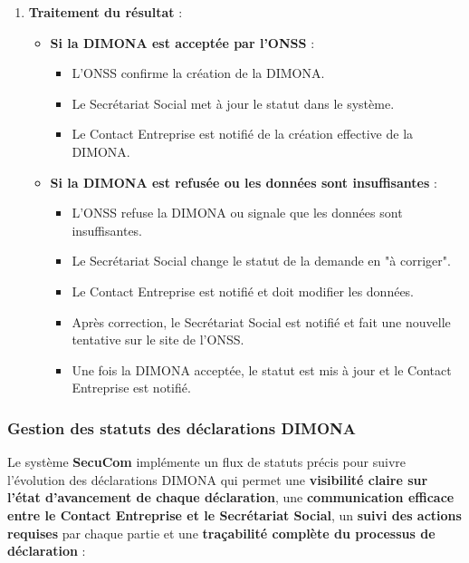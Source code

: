 \begin{enumerate}
  \newpage
  \item \textbf{Traitement du résultat} :
    \begin{itemize}[leftmargin=*,label=\textcolor{darkgray}{$\bullet$},itemsep=0.3em]
      \item \textbf{Si la DIMONA est acceptée par l'ONSS} :
        \begin{itemize}[leftmargin=*,label=\textcolor{darkgray}{$\bullet$},itemsep=0.3em]
          \item L'ONSS confirme la création de la DIMONA.
          \item Le Secrétariat Social met à jour le statut dans le système.
          \item Le Contact Entreprise est notifié de la création effective de la DIMONA.
        \end{itemize}
      \item \textbf{Si la DIMONA est refusée ou les données sont insuffisantes} :
        \begin{itemize}[leftmargin=*,label=\textcolor{darkgray}{$\bullet$},itemsep=0.3em]
          \item L'ONSS refuse la DIMONA ou signale que les données sont insuffisantes.
          \item Le Secrétariat Social change le statut de la demande en "à corriger".
          \item Le Contact Entreprise est notifié et doit modifier les données.
          \item Après correction, le Secrétariat Social est notifié et fait une nouvelle tentative sur le site de l'ONSS.
          \item Une fois la DIMONA acceptée, le statut est mis à jour et le Contact Entreprise est notifié.
        \end{itemize}
    \end{itemize}
\end{enumerate}

\subsubsection{Gestion des statuts des déclarations DIMONA}

\noindent Le système \textbf{SecuCom} implémente un flux de statuts précis pour suivre l'évolution des déclarations DIMONA qui permet une \textbf{visibilité claire sur l'état d'avancement de chaque déclaration}, une \textbf{communication efficace entre le Contact Entreprise et le Secrétariat Social}, un \textbf{suivi des actions requises} par chaque partie et une \textbf{traçabilité complète du processus de déclaration} :

